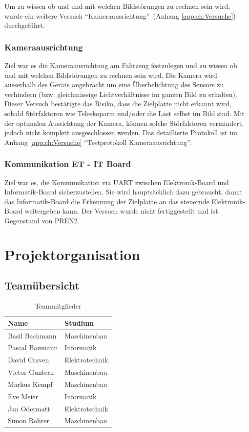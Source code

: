 \documentclass[a4paper]{report}
\begin{document}
Um zu wissen ob und und mit welchen Bildstörungen zu rechnen sein wird, wurde ein weitere Versuch \textquotedblleft Kameraausrichtung\textquotedblright\ (Anhang \ref{app:ch:Versuche}) durchgeführt.

\subsection{Kameraausrichtung}
\label{ssec:VersKamera}
Ziel war es die Kameraausrichtung am Fahrzeug festzulegen und zu wissen ob und mit welchen Bildstörungen zu rechnen sein wird.
Die Kamera wird ausserhalb des Geräts angebracht um eine Überbelichtung des Sensors zu verhindern (bzw. gleichmässige Lichtverhältnisse im ganzen Bild zu erhalten).
Dieser Versuch bestätigte das Risiko, dass die Zielplatte nicht erkannt wird, sobald Störfaktoren wie Teleskoparm und/oder die Last selbst im Bild sind.  Mit der optimalen Ausrichtung der Kamera, können solche Störfaktoren vermindert, jedoch nicht komplett ausgeschlossen werden. Das detaillierte Protokoll ist im Anhang \ref{app:ch:Versuche}  \textquotedblleft Testprotokoll Kameraausrichtung\textquotedblright.

\subsection{Kommunikation ET - IT Board}
\label{ssec:VersKomm}
Ziel war es, die Kommunikation via UART zwischen Elektronik-Board und Informatik-Board sicherzustellen. Sie wird hauptsächlich dazu gebraucht, damit das Informatik-Board die Erkennung der Zielplatte an das steuernde Elektronik-Board weitergeben kann. Der Versuch wurde nicht fertiggestellt und ist Gegenstand von PREN2.

\chapter{Projektorganisation}
\label{ch:ProjektOrga}

\section{Teamübersicht}
\label{sec:Teamuebersicht}
\begin{table}[h!]
	\centering
	\begin{tabular}{|p{}|p{}|}
		\hline
		\textbf{Name} & \textbf{Studium} \\
		\hline
		Basil Bachmann & Maschinenbau \\
		\hline
		Pascal Baumann & Informatik \\
		\hline
		David Craven & Elektrotechnik \\
		\hline
		Victor Guntern & Maschinenbau \\
		\hline
		Markus Kempf & Maschinenbau \\
		\hline
		Eve Meier & Informatik \\
		\hline
		Jan Odermatt & Elektrotechnik \\
		\hline
		Simon Rohrer & Maschinenbau \\
		\hline
	\end{tabular}
	\caption{Teammitglieder}
	\label{tab:TeamMitglieder}
\end{table}
\end{document}
